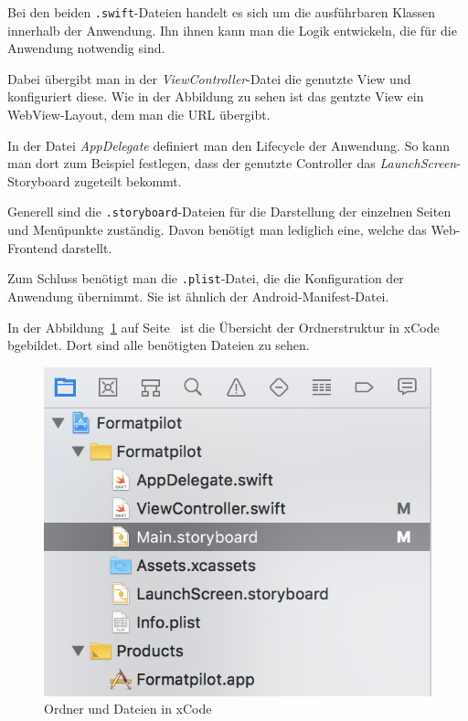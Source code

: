 Bei den beiden \texttt{.swift}-Dateien handelt es sich um die ausführbaren Klassen innerhalb der Anwendung. Ihn ihnen
kann man die Logik entwickeln, die für die Anwendung notwendig sind.

Dabei übergibt man in der \textit{ViewController}-Datei die genutzte View und konfiguriert diese. Wie in der Abbildung
zu sehen ist das gentzte View ein WebView-Layout, dem man die URL übergibt.

In der Datei \textit{AppDelegate} definiert man den Lifecycle der Anwendung. So kann man dort zum Beispiel festlegen,
dass der genutzte Controller das \textit{LaunchScreen}-Storyboard zugeteilt bekommt.

Generell sind die \texttt{.storyboard}-Dateien für die Darstellung der einzelnen Seiten und Menüpunkte zuständig. Davon
benötigt man lediglich eine, welche das Web-Frontend darstellt.

Zum Schluss benötigt man die \texttt{.plist}-Datei, die die Konfiguration der Anwendung übernimmt. Sie ist ähnlich der
Android-Manifest-Datei.

In der Abbildung~\ref{fig:umsetzung_ios_folder} auf Seite~\pageref{fig:umsetzung_ios_folder} ist die Übersicht der
Ordnerstruktur in xCode bgebildet. Dort sind alle benötigten Dateien zu sehen.

\begin{figure}[h]
    \centering
    \includegraphics[scale=0.6]{images/kapitel_4/ios_folder.png}
    \caption{Ordner und Dateien in xCode}
    \label{fig:umsetzung_ios_folder}
\end{figure}

